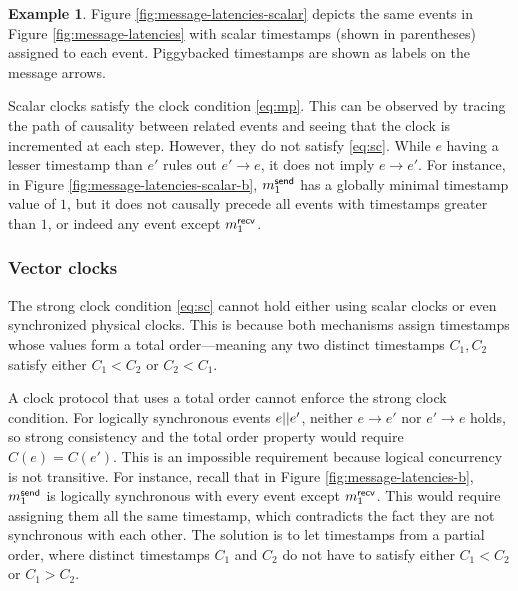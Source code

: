 \documentclass[]             %
{NASA}                       %
\theoremstyle{definition}
\newtheorem{example}[theorem]{Example}
\begin{document}
\begin{example}
  Figure \ref{fig:message-latencies-scalar} depicts the same events in
  Figure \ref{fig:message-latencies} with scalar timestamps (shown in
  parentheses) assigned to each event. Piggybacked timestamps are
  shown as labels on the message arrows.
\end{example}

Scalar clocks satisfy the clock condition \eqref{eq:mp}. This can be
observed by tracing the path of causality between related events and
seeing that the clock is incremented at each step. However, they do
not satisfy \eqref{eq:sc}.  While $e$ having a lesser timestamp than
$e'$ rules out $e' \to e$, it does not imply $e \to e'$. For instance,
in Figure \ref{fig:message-latencies-scalar-b}, $m_{1}^{\mathsf{send}}$ has a
globally minimal timestamp value of $1$, but it does not causally
precede all events with timestamps greater than $1$, or indeed any
event except $m_{1}^{\mathsf{recv}}$.

\subsubsection{Vector clocks}
\label{sssec:vector-clocks}
The strong clock condition \eqref{eq:sc} cannot hold either using
scalar clocks or even synchronized physical clocks. This is because
both mechanisms assign timestamps whose values form a total order---meaning any
two distinct timestamps $C_1, C_2$ satisfy either $C_1 < C_2$ or $C_2 < C_1$.

A clock protocol that uses a total order cannot enforce the strong
clock condition. For logically synchronous events $e || e'$,
neither $e \to e'$ nor $e' \to e$ holds, so strong consistency and the
total order property would require $C(e) = C(e')$. This is an
impossible requirement because logical concurrency is not
transitive. For instance, recall that in Figure
\ref{fig:message-latencies-b}, $m_{1}^{\mathsf{send}}$ is logically synchronous
with every event except $m_{1}^{\mathsf{recv}}$. This would require assigning them
all the same timestamp, which contradicts the fact they are not
synchronous with each other. The solution is to let timestamps from a
partial order, where distinct timestamps $C_1$ and $C_2$ do not have
to satisfy either $C_1 < C_2$ or $C_1 > C_2$.
\end{document}
